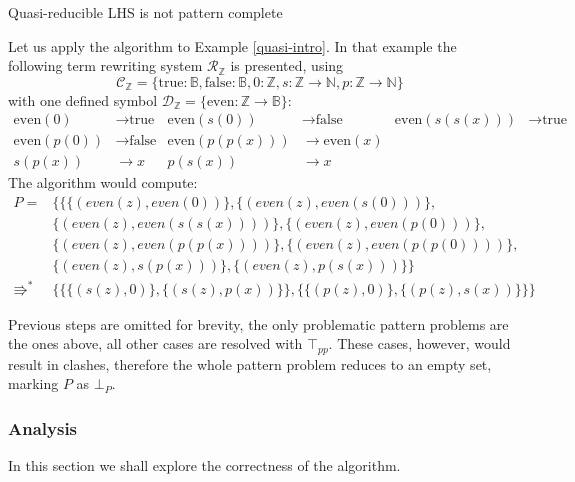 \begin{example} Quasi-reducible LHS is not pattern complete \label{quasi-ex}

Let us apply the algorithm to Example \ref{quasi-intro}. In that example the following term rewriting system $\mathcal{R}_{\mathbb{Z}}$ is presented, using $$\mathcal{C}_{\mathbb{Z}} = \{\text{true}: \mathbb{B}, \text{false}: \mathbb{B}, 0: \mathbb{Z}, s: \mathbb{Z} \rightarrow \mathbb{N}, p: \mathbb{Z} \rightarrow \mathbb{N}\}$$ with one defined symbol $\mathcal{D}_{\mathbb{Z}} = \{\text{even}: \mathbb{Z} \rightarrow \mathbb{B}\}$:
\begin{align*}
    \text{even}(0) &\rightarrow \text{true} & \text{even}(s(0)) &\rightarrow \text{false} & \text{even}(s(s(x))) &\rightarrow \text{true} \\
    \text{even}(p(0)) &\rightarrow \text{false} &
    \text{even}(p(p(x))) &\rightarrow \text{even}(x) \\ 
    s(p(x)) &\rightarrow x & p(s(x)) &\rightarrow x
\end{align*}
The algorithm would compute:
\begin{align*}
    P = &\{\{\{(even(z), even(0))\}, \{(even(z), even(s(0)))\}, \\
    &\{(even(z), even(s(s(x))))\}, \{(even(z), even(p(0)))\}, \\
    &\{(even(z), even(p(p(x))))\}, \{(even(z), even(p(p(0))))\}, \\
    &\{(even(z), s(p(x)))\}, \{(even(z), p(s(x)))\}\} \\
    \Rrightarrow^{*} &\{\{\{(s(z), 0)\},  \{(s(z), p(x))\}\}, \{\{(p(z), 0)\},\{(p(z), s(x))\}\}\}
\end{align*}

Previous steps are omitted for brevity, the only problematic pattern problems are the ones above, all other cases are resolved with $\top_{pp}$. These cases, however, would result in clashes, therefore the whole pattern problem reduces to an empty set, marking $P$ as $\bot_{P}$.
\end{example}

\subsubsection{Analysis}
In this section we shall explore the correctness of the algorithm.

